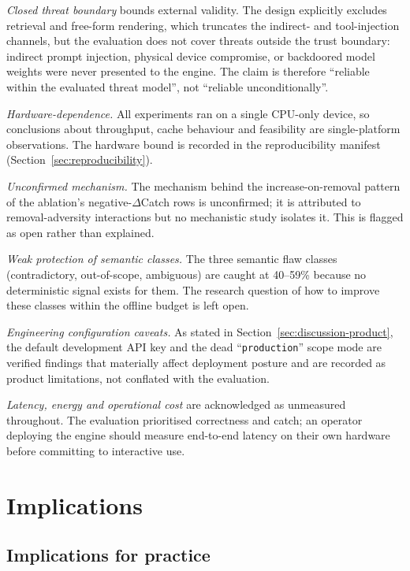 \emph{Closed threat boundary} bounds external validity. The design explicitly
excludes retrieval and free-form rendering, which truncates the indirect- and
tool-injection channels, but the evaluation does not cover threats outside the
trust boundary: indirect prompt injection, physical device compromise, or
backdoored model weights were never presented to the engine. The claim is
therefore ``reliable within the evaluated threat model'', not ``reliable
unconditionally''.

\emph{Hardware-dependence.} All experiments ran on a single CPU-only device,
so conclusions about throughput, cache behaviour and feasibility are
single-platform observations. The hardware bound is recorded in the
reproducibility manifest (Section~\ref{sec:reproducibility}).

\emph{Unconfirmed mechanism.} The mechanism behind the
increase-on-removal pattern of the ablation's negative-$\Delta$Catch rows is
unconfirmed; it is attributed to removal-adversity interactions but no
mechanistic study isolates it. This is flagged as open rather than explained.

\emph{Weak protection of semantic classes.} The three semantic flaw classes
(contradictory, out-of-scope, ambiguous) are caught at 40--59\% because no
deterministic signal exists for them. The research question of how to improve
these classes within the offline budget is left open.

\emph{Engineering configuration caveats.} As stated in
Section~\ref{sec:discussion-product}, the default development API key and the
dead ``\texttt{production}'' scope mode are verified findings that materially
affect deployment posture and are recorded as product limitations, not
conflated with the evaluation.

\emph{Latency, energy and operational cost} are acknowledged as unmeasured
throughout. The evaluation prioritised correctness and catch; an operator
deploying the engine should measure end-to-end latency on their own hardware
before committing to interactive use.

\section{Implications}\label{sec:discussion-implications}

\subsection*{Implications for practice}

